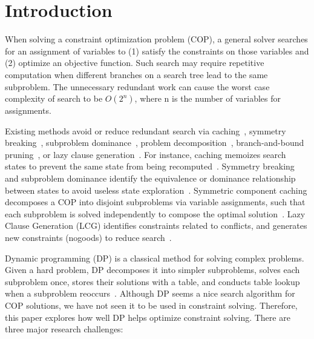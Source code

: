 \section{Introduction}
When solving a constraint optimization problem (COP), a general solver searches for an assignment of variables to (1) satisfy the constraints on those variables and (2) optimize an objective function. Such search may require repetitive computation when different branches on a search tree lead to the same subproblem. The unnecessary redundant work can cause the worst case complexity of search to be $O(2^n)$, where n is the number of variables for assignments. 

Existing methods avoid or reduce redundant search via caching~\cite{Smith2005}, symmetry breaking~\cite{Gent2006}, subproblem dominance~\cite{chu2012exploiting}, problem  decomposition~\cite{kitching2007symmetric}, branch-and-bound pruning~\cite{marinescu2005and}, or lazy clause generation~\cite{ohrimenko2009propagation}. For instance, caching memoizes search states to prevent the same state from being recomputed~\cite{Smith2005}. 
Symmetry breaking and subproblem dominance identify the equivalence or dominance relationship between states to avoid useless state  exploration~\cite{Gent2006,chu2012exploiting}. Symmetric component caching decomposes a COP into disjoint subproblems via variable assignments, such that each subproblem is solved independently to compose the optimal solution~\cite{kitching2007symmetric}. 
Lazy Clause Generation (LCG) identifies constraints related to conflicts, and generates new constraints (nogoods) to reduce search~\cite{ohrimenko2009propagation}. 

Dynamic programming (DP) is 
a classical method for solving complex problems. 
Given a hard problem, DP decomposes it into 
simpler subproblems, solves each subproblem once, stores their solutions with a table, and conducts table lookup when a subproblem reoccurs~\cite{Bertsekas:2000}. 
Although DP seems a nice search algorithm for COP solutions, we have not seen it to be used in constraint solving. 
Therefore, this paper explores how well DP helps optimize constraint solving. 
There are three major research challenges: 


